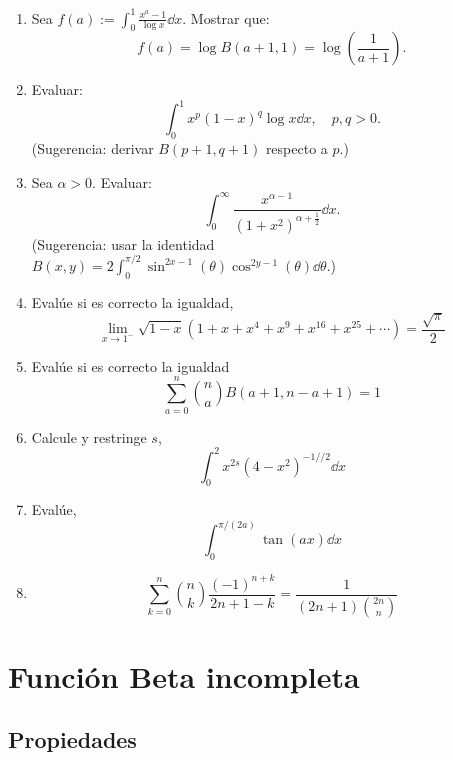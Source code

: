 \begin{enumerate}
	\item Sea \( f(a) := \int_0^1 \frac{x^a - 1}{\log x} \dd{x} \). Mostrar que:
	      \[
		      f(a) = \log B(a + 1, 1) = \log\left( \frac{1}{a + 1} \right).
	      \]

	\item Evaluar:
	      \[
		      \int_0^1 x^p (1 - x)^q \log x \dd{x}, \quad p, q > 0.
	      \]
	      (Sugerencia: derivar \( B(p+1, q+1) \) respecto a \( p \).)




	\item Sea \( \alpha > 0 \). Evaluar:
	      \[
		      \int_0^\infty \frac{x^{\alpha - 1}}{(1 + x^2)^{\alpha + \frac{1}{2}}} \dd{x}.
	      \]
	      (Sugerencia: usar la identidad \( B(x,y) = 2\int_0^{\pi/2} \sin^{2x-1}(\theta) \cos^{2y-1}(\theta) \dd{\theta} \).)
	\item Evalúe si es correcto la igualdad,
	      $$
		      \lim\limits_{x \to 1^{-}} \sqrt{1-x} (1+x+x^4+x^9+x^{16}+x^{25}+\cdots) = \frac{\sqrt{\pi}}{2}
	      $$
	\item Evalúe si es correcto la igualdad
	      $$
		      \sum_{a=0}^{n} \binom{n}{a} B(a+1, n-a+1) = 1
	      $$
	\item Calcule y restringe $s$,
	      $$
		      \int_{0}^{2} x^{2s} (4-x^2)^{-1//2} \dd{x}
	      $$
	\item Evalúe,
	      $$
		      \int_{0}^{\pi/(2a)} \tan(ax) \dd{x}
	      $$

	\item
	      $$
		      \sum_{k=0}^{n} \binom{n}{k} \frac{(-1)^{n+k}}{2n+1-k} = \frac{1}{(2n+1) \binom{2n}{n}}
	      $$

\end{enumerate}

\section{Función Beta incompleta}


\subsection{ Propiedades}

